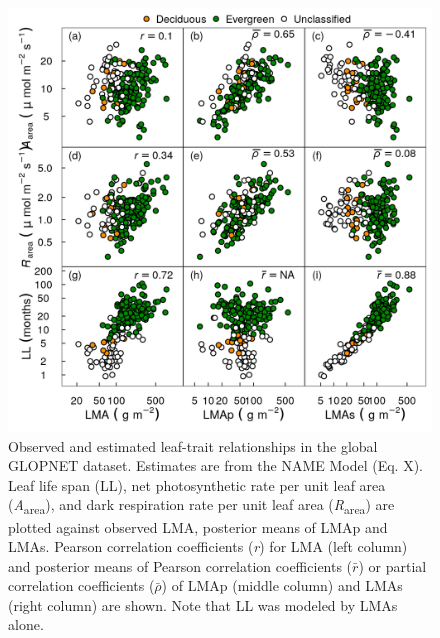 \documentclass[
  12pt,
  a4paper,
,tablecaptionabove
]{scrartcl}
\begin{document}
\begin{figure}
\hypertarget{fig:GLplt}{%
\centering
\includegraphics{../figs/gl_point.png}
\caption{Observed and estimated leaf-trait relationships in the global GLOPNET dataset.
Estimates are from the NAME Model (Eq. X).
Leaf life span (LL), net photosynthetic rate per unit leaf area (\emph{A}\textsubscript{area}), and dark respiration rate per unit leaf area (\emph{R}\textsubscript{area}) are plotted against observed LMA, posterior means of LMAp and LMAs.
Pearson correlation coefficients (\emph{r}) for LMA (left column) and posterior means of Pearson correlation coefficients (\(\bar{r}\)) or partial correlation coefficients (\(\bar{\rho}\)) of LMAp (middle column) and LMAs (right column) are shown.
Note that LL was modeled by LMAs alone.}\label{fig:GLplt}
}
\end{figure}

\newpage
\end{document}
